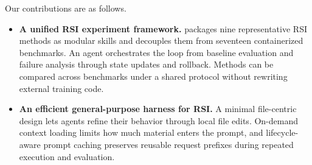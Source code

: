 Our contributions are as follows.
\begin{itemize}
  \item \textbf{A unified RSI experiment framework.} \fwname packages nine representative RSI methods as modular skills and decouples them from seventeen containerized benchmarks. An agent orchestrates the loop from baseline evaluation and failure analysis through state updates and rollback. Methods can be compared across benchmarks under a shared protocol without rewriting external training code.
  \item \textbf{An efficient general-purpose harness for RSI.} A minimal file-centric design lets agents refine their behavior through local file edits. On-demand context loading limits how much material enters the prompt, and lifecycle-aware prompt caching preserves reusable request prefixes during repeated execution and evaluation.
\end{itemize}

